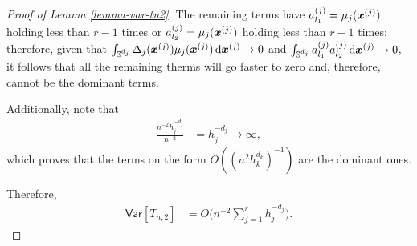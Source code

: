 \documentclass[oneside,11pt]{article}
\begin{document}
\begin{proof}[Proof of Lemma \ref{lemma-var-tn2}]
The remaining terms have $a_{l_1}^{(j)} = \mu_j(\boldsymbol{x}^{(j)})$ holding less than $r-1$ times or $a_{l_2}^{(j)} = \mu_j(\boldsymbol{x}^{(j)})$ holding less than $r-1$ times; therefore, given that $\int_{\mathbb{S}^{d_j}} \Delta_{j}(\boldsymbol{x}^{(j)}) \mu_{j}(\boldsymbol{x}^{(j)}) \,\mathrm{d} \boldsymbol{x}^{(j)} \to 0$ and $\int_{\mathbb{S}^{d_j}} a_{l_1}^{(j)} a_{l_2}^{(j)} \,\mathrm{d} \boldsymbol{x}^{(j)} \to 0$, it follows that all the remaining therms will go faster to zero and, therefore, cannot be the dominant terms.


Additionally, note that 
\begin{align*}
    \frac{n^{-2}h_{j}^{-d_{j}}}{n^{-2}} &= h_{j}^{-d_{j}} \to \infty,
\end{align*}
which proves that the terms on the form $O((n^2 h_k^{d_k})^{-1})$ are the dominant ones.

Therefore,
\begin{align*}
        \mathsf{Var} [T_{n,2}] &=  O \Bigg(n^{-2} \sum_{j=1}^{r} h_j^{-d_j} \Bigg).
\end{align*}
\end{proof}
\end{document}
